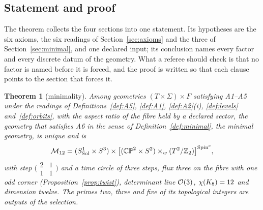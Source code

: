 \documentclass[11pt,a4paper]{article}
\theoremstyle{plain}
\newtheorem{theorem}{Theorem}[section]
\theoremstyle{definition}
\theoremstyle{remark}
\newcommand{\Sol}{\mathrm{Sol}}
\begin{document}
\subsection{Statement and proof}

The theorem collects the four sections into one statement. Its hypotheses are the six axioms, the six readings of Section~\ref{sec:axioms} and the three of Section~\ref{sec:minimal}, and one declared input; its conclusion names every factor and every discrete datum of the geometry. What a referee should check is that no factor is named before it is forced, and the proof is written so that each clause points to the section that forces it.

\begin{theorem}[minimality]\label{thm:main}
Among geometries $(T\times\Sigma)\times F$ satisfying A1--A5 under the readings of Definitions~\ref{def:A5}, \ref{def:A1}, \ref{def:A2}(i), \ref{def:levels} and~\ref{def:orbits}, with the aspect ratio of the fibre held by a declared sector, the geometry that satisfies A6 in the sense of Definition~\ref{def:minimal}, the minimal geometry, is unique and is
\[
\Mtwelve=(S^{1}_{\Sol}\times S^{3})\times\bigl[(\CPtwo\times\Stwo)\times_{w}(\Ttwo/\Ztwo)\bigr]^{\Spinc},
\]
with step $\bigl(\begin{smallmatrix}2&1\\1&1\end{smallmatrix}\bigr)$ and a time circle of three steps, flux three on the fibre with one odd corner (Proposition~\ref{prop:twist}), determinant line $\mathcal{O}(3)$, $\chi(K_8)=12$ and dimension twelve. The primes two, three and five of its topological integers are outputs of the selection.
\end{theorem}
\end{document}
